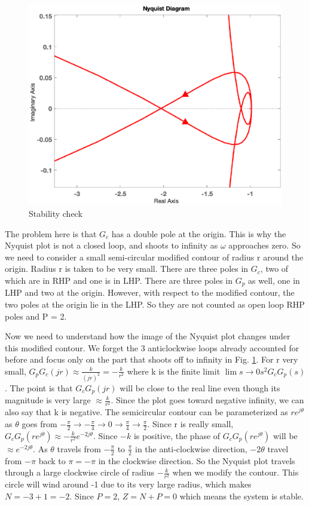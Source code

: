 \documentclass[12pt]{article}
\begin{document}
 \begin{figure}[H]
    \centering
    \includegraphics[scale=0.6]{figs/8.2-2.eps}
    \caption{Stability check}
    \label{fig:prb_4b}
\end{figure}


The problem here is that $G_c$ has a double pole at the origin. This is why the Nyquist plot
is not a closed loop, and shoots to infinity as $\omega$ approaches zero. So we need to consider a small semi-circular modified contour of radius r around the origin. Radius r is taken to be very small. There are three poles in $G_c$, two of which are in RHP and one is in LHP. There are three poles in $G_p$ as well, one in LHP and two at the origin. However, with respect to the modified contour, the two poles at the origin lie in the LHP. So they are not counted as open loop RHP poles and P = 2.

Now we need to understand how the image of the Nyquist plot changes under this modified contour. We forget the 3 anticlockwise loops already accounted for before and focus only on the part that shoots off to infinity in Fig. \ref{fig:prb_4b}. For r very small, $G_p G_c\left(j r \right) \approx  \frac{k}{(jr)^2} = - \frac{k}{r^2}$  where k is the finite limit $\lim s \rightarrow 0 s^2 G_c G_p(s)$. The point is that $G_cG_p(jr)$ will be close to the real line even though its magnitude is very large $\approx \frac{k}{r^2}$. Since the plot goes toward negative infinity, we can also say that k is negative. The semicircular contour can be parameterized as $r e^{j\theta}$ as $\theta$ goes from $ - \frac{\pi}{2} \rightarrow  - \frac{\pi}{4} \rightarrow 0 \rightarrow \frac{\pi}{4} \rightarrow \frac{\pi}{2}$. Since r is really small, $G_cG_p(re^{j\theta}) \approx -\frac{k}{r^2}e^{-2j\theta}$. Since $-k$ is positive, the phase of $G_cG_p(re^{j\theta})$ will be $\approx e^{-2 j \theta}$. As $\theta$ travels from $-\frac{\pi}{2}$ to $\frac{\pi}{2}$ in the anti-clockwise direction, $-2\theta$ travel from $-\pi$ back to $\pi = - \pi $ in the clockwise direction. So the Nyquist plot travels through a large clockwise circle of radius $-\frac{k}{r^2}$ when we modify the contour. This circle will wind around -1 due to its very large radius, which makes $N =-3+1=-2$. Since $P = 2$, $Z = N + P = 0$ which means the system is stable.
\clearpage
\end{document}

